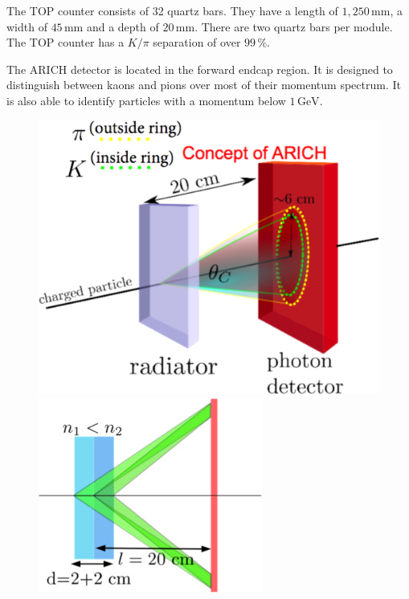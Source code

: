 \documentclass[a4paper,11pt,twosided,final,german,openbib,pdftex,listof=totoc,bibliography=totoc]{scrbook}
\begin{document}
The TOP counter consists of 32 quartz bars. They have a length of $1,250\,\textrm{mm}$, a width of $45\,\textrm{mm}$ and a depth of $20\,\textrm{mm}$. There are two quartz bars per module. The TOP counter has a $K/\pi$ separation of over $99\,\%$.\cite{B2TR}

The ARICH detector is located in the forward endcap region. It is designed to distinguish between kaons and pions over most of their momentum spectrum. It is also able to identify particles with a momentum below $1\,\textrm{GeV}$.

\begin{figure}[h!]
	\centering
\begin{minipage}[b]{0.45\linewidth}
	\centering
	\includegraphics[width=\textwidth]{Bilder/ARICH}
\end{minipage}
\hspace{0.5cm}
\begin{minipage}[b]{0.45\linewidth}
	\centering
	\includegraphics[width=\textwidth]{Bilder/ARICH2}
\end{minipage}


\end{figure}
\end{document}
